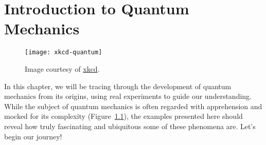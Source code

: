 %

%

\chapter[Introduction]{Introduction to Quantum Mechanics} \label{ch:intro}
\begin{figure}[!h]
	\centering
	\texttt{[image: xkcd-quantum]} \label{fig:xkcd1} %
	\caption{Image courtesy of \href{https://xkcd.com/1240/}{xkcd}.}
	\label{fig:comic1}
\end{figure}

In this chapter, we will be tracing through the development of quantum mechanics from its origins, using real experiments to guide our understanding. While the subject of quantum mechanics is often regarded with apprehension and mocked for its complexity (Figure~\ref{fig:comic1}), the examples presented here should reveal how truly fascinating and ubiquitous some of these phenomena are. Let's begin our journey!


